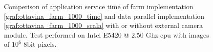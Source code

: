 \begin{figure}[p]
\centering
{}
\caption{ Comperison of application service time of farm implementation \ref{graf:ottavina_farm_1000_time} and data parallel implementation  \ref{graf:ottavina_farm_1000_scala} with or without external camera module. Test performed on Intel E5420 @ 2.50 Ghz cpu with images of $10^6$ 8bit pixels.}
\label{chart:ottavina_camera}
\end{figure}

